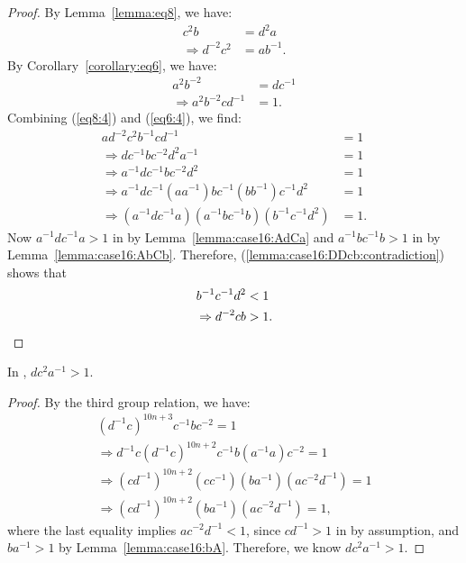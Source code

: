 \begin{proof} By Lemma~\ref{lemma:eq8}, we have:
\begin{align}
c^{2}b&=d^{2}a\nonumber{}\\
\Rightarrow{}d^{-2}c^{2}&=ab^{-1}.\label{eq8:4}
\end{align}
By Corollary~\ref{corollary:eq6}, we have:
\begin{align}
a^{2}b^{-2}&=dc^{-1}\nonumber{}\\
\Rightarrow{}a^{2}b^{-2}cd^{-1}&=1.\label{eq6:4}
\end{align}
Combining (\ref{eq8:4}) and (\ref{eq6:4}), we find:
\begin{align}
ad^{-2}c^{2}b^{-1}cd^{-1}&=1\label{eq18}\\
\Rightarrow{}dc^{-1}bc^{-2}d^{2}a^{-1}&=1\nonumber{}\\
\Rightarrow{}a^{-1}dc^{-1}bc^{-2}d^{2}&=1\nonumber{}\\
\Rightarrow{}a^{-1}dc^{-1}(aa^{-1})bc^{-1}(bb^{-1})c^{-1}d^{2}&=1\nonumber{}\\
\Rightarrow{}(a^{-1}dc^{-1}a)(a^{-1}bc^{-1}b)(b^{-1}c^{-1}d^{2})&=1.\label{lemma:case16:DDcb:contradiction}
\end{align}
Now $a^{-1}dc^{-1}a>1$ in  by Lemma~\ref{lemma:case16:AdCa} and $a^{-1}bc^{-1}b>1$ in  by Lemma~\ref{lemma:case16:AbCb}. Therefore, (\ref{lemma:case16:DDcb:contradiction}) shows that
\begin{align*}
b^{-1}c^{-1}d^{2}&<1\\
\Rightarrow{}d^{-2}cb&>1.\qedhere
\end{align*}
\end{proof}

\begin{lemma} In , $dc^{2}a^{-1}>1$.
\label{lemma:case16:dccA}
\end{lemma}
\begin{proof} By the third group relation, we have:
\begin{align*}
(d^{-1}c)^{10n+3}c^{-1}bc^{-2}=1\\
\Rightarrow{}d^{-1}c(d^{-1}c)^{10n+2}c^{-1}b(a^{-1}a)c^{-2}=1\\
\Rightarrow{}(cd^{-1})^{10n+2}(cc^{-1})(ba^{-1})(ac^{-2}d^{-1})=1\\
\Rightarrow{}(cd^{-1})^{10n+2}(ba^{-1})(ac^{-2}d^{-1})=1,
\end{align*}
where the last equality implies $ac^{-2}d^{-1}<1$, since $cd^{-1}>1$ in  by assumption, and $ba^{-1}>1$ by Lemma~\ref{lemma:case16:bA}. Therefore, we know $dc^{2}a^{-1}>1$.
\end{proof}

